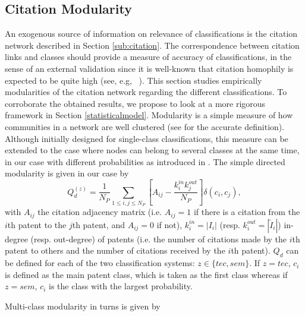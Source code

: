 \documentclass[12pt,twoside,a4paper]{article}
\begin{document}
\subsection{Citation Modularity}
\label{citationmodularity}

An exogenous source of information on relevance of classifications is the citation network described in Section \ref{sub:citation}. The correspondence between citation links and classes should provide a measure of accuracy of classifications, in the sense of an external validation since it is well-known that citation homophily  is expected to be quite high (see, e.g, ~\cite{AAKnetwork2016}). This section studies empirically modularities of the citation network regarding the different classifications. To corroborate the obtained results, we propose to look at a more rigorous framework in Section \ref{statisticalmodel}. Modularity is a simple measure of how communities in a network are well clustered (see \cite{clauset2004finding} for the accurate definition). Although initially designed for single-class classifications, this measure can be extended to the case where nodes can belong to several classes at the same time, in our case with different probabilities as introduced in \cite{nicosia2009extending}. The simple directed modularity is given in our case by
\[
Q_d^{(z)} = \displaystyle \frac{1}{N_P}\sum_{1\leq i,j\leq N_P}\left[A_{ij} - \frac{k_{i}^{in}k_{j}^{out}}{N_P}\right]\delta(c_i,c_j),
\]
with $A_{ij}$ the citation adjacency matrix (i.e. $A_{ij} = 1$ if there is a citation from the $i$th patent to the $j$th patent, and $A_{ij}=0$ if not), $k_i^{in}=\left| I_i\right|$ (resp. $k_i^{out}= \left|\tilde{I}_i \right|$) in-degree (resp. out-degree) of patents (i.e. the number of citations made by the $i$th patent to others and the number of citations received by the $i$th patent). $Q_d$ can be defined for each of the two classification systems: $z \in \{tec, sem\}$. If $z=tec$, $c_i$ is defined as the main patent class, which is taken as the first class whereas if $z=sem$, $c_i$ is the class with the largest probability.

Multi-class modularity in turns is given by
\end{document}
